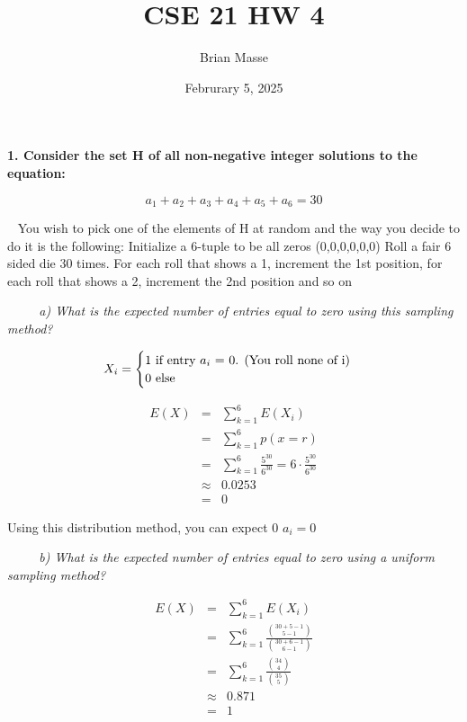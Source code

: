 \documentclass[12pt, letterpaper]{article}
\title{CSE 21 HW 4}
\author{Brian Masse}
\date{Februrary 5, 2025}
\begin{document}
\maketitle
\newpage


\bf{ 1. Consider the set H of all non-negative integer solutions to the equation: }

\[ a_{1} + a_{2} + a_{3} + a_{4} + a_{5} + a_{6} = 30  \]

\-\ \newline
\textnormal{You wish to pick one of the elements of H at random and the way you decide to do it is the following:
Initialize a 6-tuple to be all zeros (0,0,0,0,0,0) Roll a fair 6 sided die 30 times. For each roll that shows a 1, increment the 1st position, for each roll
that shows a 2, increment the 2nd position and so on}

\-\ \newline
\-\ \newline
\-\ \it{ a) What is the expected number of entries equal to zero using this sampling method? }

\[ 
X_i = 
\begin{cases} 
      1 \mbox{\textnormal{ if entry \(a_i\) = 0. (You roll none of i)}} \\
      0 \mbox{\textnormal{ else}} \\
   \end{cases}
\]

\begin{eqnarray}
    E(X) &=& \sum_{k=1}^{6} E(X_i) \\
    &=& \sum_{k=1}^{6} p(x = r) \\
    &=& \sum_{k=1}^{6} \frac{5^{30}}{6^{30}} = 6 \cdot \frac{5^{30}}{6^{30}} \\
    &\approx& 0.0253 \\
    &=& 0
\end{eqnarray}

Using this distribution method, you can expect 0 \(a_i = 0\)


\-\ \newline
\-\ \newline
\-\ \it{ b) What is the expected number of entries equal to zero using a uniform sampling method? }

\begin{eqnarray}
    E(X) &=& \sum_{k=1}^{6} E(X_i) \\
    &=& \sum_{k=1}^{6} \frac{{ 30 + 5 - 1 \choose 5 - 1 }}{{30 + 6 - 1 \choose 6 - 1}} \\
    &=& \sum_{k=1}^{6} \frac{{ 34 \choose 4 }}{{35 \choose 5}} \\
    &\approx& 0.871 \\
    &=& 1
\end{eqnarray}
\end{document}
